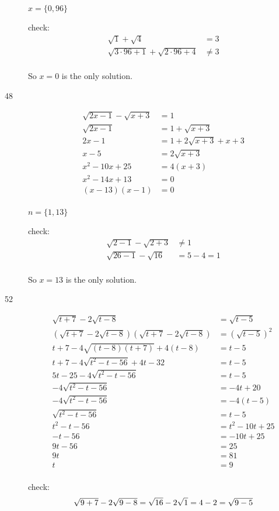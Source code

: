 \documentclass[fleqn,addpoints]{exam}
\begin{document}
\begin{description}
$x = \{0, 96\}$

check:
\begin{align*}
  \sqrt{1} + \sqrt{4} &= 3 \\
  \sqrt{3 \cdot 96 + 1} + \sqrt{2 \cdot 96 + 4} &\neq 3 \\
\end{align*}

So $x=0$ is the only solution.

\item[48]
\begin{align*}
  \sqrt{2x-1} - \sqrt{x+3} &= 1 \\
  \sqrt{2x-1}  &= 1 + \sqrt{x+3} \\
  2x-1  &= 1 + 2\sqrt{x+3} + x + 3 \\
  x-5  &= 2\sqrt{x+3} \\
  x^2-10x+25  &= 4(x+3) \\
  x^2-14x+13 &= 0 \\
  (x-13)(x-1) &= 0 \\
\end{align*}

$n = \{1, 13 \}$

check:
\begin{align*}
  \sqrt{2-1} - \sqrt{2+3} &\neq 1 \\
  \sqrt{26-1} - \sqrt{16} &= 5-4 = 1 \\
\end{align*}

So $x=13$ is the only solution.

\item[52]
\begin{align*}
  \sqrt{t+7} - 2\sqrt{t-8} &= \sqrt{t-5} \\
  (\sqrt{t+7} - 2\sqrt{t-8})(\sqrt{t+7} - 2\sqrt{t-8}) &= (\sqrt{t-5})^2 \\
  t+7 - 4\sqrt{(t-8)(t+7)} + 4(t-8) &= t-5 \\
  t+7 - 4\sqrt{t^2-t-56} + 4t - 32 &= t-5 \\
  5t -25 - 4\sqrt{t^2-t-56}  &= t-5 \\
  -4\sqrt{t^2-t-56}  &= -4t+20 \\
  -4\sqrt{t^2-t-56}  &= -4(t-5) \\
  \sqrt{t^2-t-56}  &= t-5 \\
  t^2-t-56  &= t^2-10t+25 \\
  -t-56  &= -10t+25 \\
  9t-56  &= 25 \\
  9t  &= 81 \\
  t  &= 9 \\
\end{align*}

check:
\[
  \sqrt{9+7} - 2\sqrt{9-8} = \sqrt{16} - 2 \sqrt{1} = 4 - 2 = \sqrt{9-5} \\
\]

\end{description}
\end{document}
